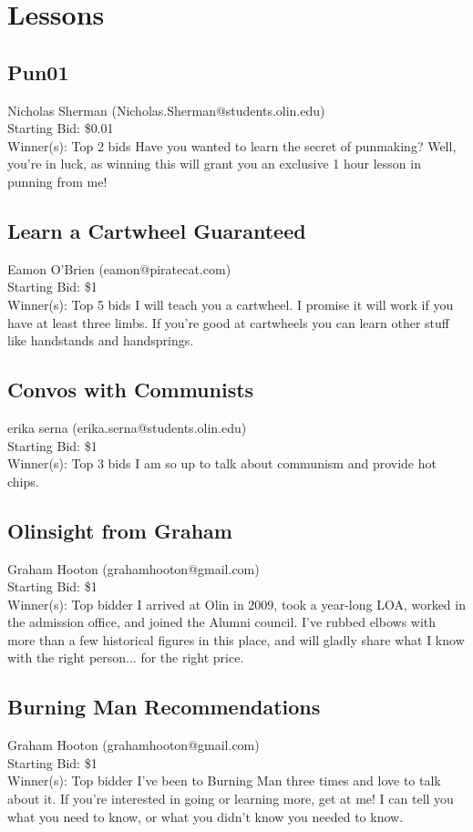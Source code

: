 \documentclass[11pt]{article}
\begin{document}
\section{Lessons}
\subsection{Pun01}
Nicholas Sherman (Nicholas.Sherman@students.olin.edu) \\
Starting Bid: \$0.01 \\
Winner(s): 
Top 2 bids\newline
Have you wanted to learn the secret of punmaking? Well, you're in luck, as winning this will grant you an exclusive 1 hour lesson in punning from me!
\subsection{Learn a Cartwheel Guaranteed}
Eamon O'Brien (eamon@piratecat.com) \\
Starting Bid: \$1 \\
Winner(s): 
Top 5 bids\newline
I will teach you a cartwheel. I promise it will work if you have at least three limbs. If you're good at cartwheels you can learn other stuff like handstands and handsprings.
\subsection{Convos with Communists}
erika serna (erika.serna@students.olin.edu) \\
Starting Bid: \$1 \\
Winner(s): 
Top 3 bids\newline
I am so up to talk about communism and provide hot chips.
\subsection{Olinsight from Graham}
Graham Hooton (grahamhooton@gmail.com) \\
Starting Bid: \$1 \\
Winner(s): 
Top bidder\newline
I arrived at Olin in 2009, took a year-long LOA, worked in the admission office, and joined the Alumni council. I've rubbed elbows with more than a few historical figures in this place, and will gladly share what I know with the right person... for the right price.
\subsection{Burning Man Recommendations}
Graham Hooton (grahamhooton@gmail.com) \\
Starting Bid: \$1 \\
Winner(s): 
Top bidder\newline
I've been to Burning Man three times and love to talk about it. If you're interested in going or learning more, get at me! I can tell you what you need to know, or what you didn't know you needed to know.
\end{document}
